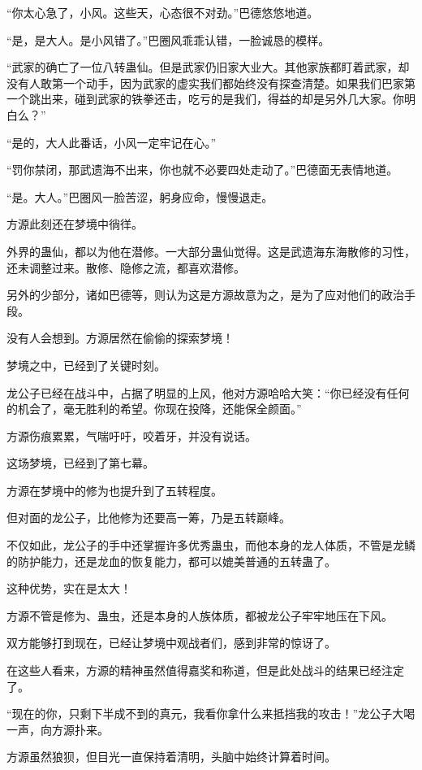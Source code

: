 \begin{this_body}
“你太心急了，小风。这些天，心态很不对劲。”巴德悠悠地道。

“是，是大人。是小风错了。”巴圈风乖乖认错，一脸诚恳的模样。

“武家的确亡了一位八转蛊仙。但是武家仍旧家大业大。其他家族都盯着武家，却没有人敢第一个动手，因为武家的虚实我们都始终没有探查清楚。如果我们巴家第一个跳出来，碰到武家的铁拳还击，吃亏的是我们，得益的却是另外几大家。你明白么？”

“是的，大人此番话，小风一定牢记在心。”

“罚你禁闭，那武遗海不出来，你也就不必要四处走动了。”巴德面无表情地道。

“是。大人。”巴圈风一脸苦涩，躬身应命，慢慢退走。

方源此刻还在梦境中徜徉。

外界的蛊仙，都以为他在潜修。一大部分蛊仙觉得。这是武遗海东海散修的习性，还未调整过来。散修、隐修之流，都喜欢潜修。

另外的少部分，诸如巴德等，则认为这是方源故意为之，是为了应对他们的政治手段。

没有人会想到。方源居然在偷偷的探索梦境！

梦境之中，已经到了关键时刻。

龙公子已经在战斗中，占据了明显的上风，他对方源哈哈大笑：“你已经没有任何的机会了，毫无胜利的希望。你现在投降，还能保全颜面。”

方源伤痕累累，气喘吁吁，咬着牙，并没有说话。

这场梦境，已经到了第七幕。

方源在梦境中的修为也提升到了五转程度。

但对面的龙公子，比他修为还要高一筹，乃是五转巅峰。

不仅如此，龙公子的手中还掌握许多优秀蛊虫，而他本身的龙人体质，不管是龙鳞的防护能力，还是龙血的恢复能力，都可以媲美普通的五转蛊了。

这种优势，实在是太大！

方源不管是修为、蛊虫，还是本身的人族体质，都被龙公子牢牢地压在下风。

双方能够打到现在，已经让梦境中观战者们，感到非常的惊讶了。

在这些人看来，方源的精神虽然值得嘉奖和称道，但是此处战斗的结果已经注定了。

“现在的你，只剩下半成不到的真元，我看你拿什么来抵挡我的攻击！”龙公子大喝一声，向方源扑来。

方源虽然狼狈，但目光一直保持着清明，头脑中始终计算着时间。


\end{this_body}

